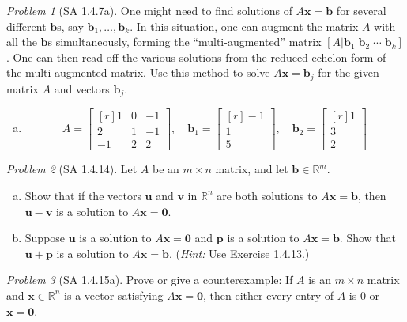 \documentclass[fleqn,11pt]{paper}
\theoremstyle{remark}
\newtheorem{problem}{Problem}
\newcommand\R{\fld{R}}
\renewcommand{\vec}[1]{\mathbf{#1}}
\newcommand{\<}{\ensuremath{\langle}}
\renewcommand{\>}{\ensuremath{\rangle}}
\newcommand\fld[1]{\ensuremath{\mathbb{#1}}}
\newcommand\vb{\vec{b}}
\newcommand\vp{\vec{p}}
\newcommand\vu{\vec{u}}
\newcommand\vv{\vec{v}}
\newcommand\vx{\vec{x}}
\newcommand\vzero{\vec{0}}
\begin{document}
\begin{problem}[SA 1.4.7a]
  One might need to find solutions of $A\vx = \vb$ for several different
  $\vb$s, say $\vb_1, \dots, \vb_k$.
  In this situation, one can augment the matrix $A$ with all the $\vb$s
  simultaneously, forming the ``multi-augmented'' matrix
  $[ A | \vb_1\; \vb_2 \; \cdots \; \vb_k ]$.
  One can then read off the various solutions from the reduced echelon form of
  the multi-augmented matrix. Use this method to solve $A\vx = \vb_j$
  for the given matrix $A$ and vectors $\vb_j$.
\begin{enumerate}[a.]
\item
\[
A = 
\begin{bmatrix*}[r]
  1 & 0 & -1 \\
  2 & 1 & -1 \\
  -1 & 2 & 2
\end{bmatrix*},
\quad
\vb_1 = \begin{bmatrix*}[r] -1\\ 1\\ 5 \end{bmatrix*},
\quad
\vb_2 = \begin{bmatrix*}[r] 1\\ 3\\ 2 \end{bmatrix*}
\]
\end{enumerate}
\end{problem}

\newpage

\begin{problem}[SA 1.4.14]
Let $A$ be an $m \times n$ matrix, and let $\vb \in \R^m$.
\begin{enumerate}[a.]
\item Show that if the vectors $\vu$ and $\vv$ in $\R^n$ are both
  solutions to $A\vx = \vb$, then $\vu - \vv$ is a solution to $A\vx = \vzero$.
\item Suppose $\vu$ is a solution to $A\vx = \vzero$ and $\vp$ is a solution to
  $A\vx = \vb$. Show that $\vu + \vp$ is a solution to $A\vx = \vb$.
  ({\it Hint:} Use Exercise 1.4.13.)
\end{enumerate}
\end{problem}

\newpage

\begin{problem}[SA 1.4.15a]
Prove or give a counterexample: If $A$ is an $m \times n$
  matrix and $\vx \in \R^n$ is a vector satisfying $A\vx = \vzero$,
  then either every entry of $A$ is $0$ or $\vx = \vzero$.
\end{problem}
\end{document}

